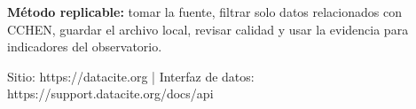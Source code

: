 \documentclass[9pt,a4paper]{extarticle}
\begin{document}
\vspace{0.06cm}
\begin{tcolorbox}[enhanced,colback=white,colframe=cchenpurple!55,boxrule=0.45pt,arc=2pt,left=6pt,right=6pt,top=5pt,bottom=5pt]
{\bfseries\color{cchenpurple}Método replicable:} tomar la fuente, filtrar solo datos relacionados con CCHEN, guardar el archivo local, revisar calidad y usar la evidencia para indicadores del observatorio.
\end{tcolorbox}

\vspace{0.02cm}
{\scriptsize\color{mutedgray}Sitio: https://datacite.org \quad | \quad Interfaz de datos: https://support.datacite.org/docs/api}
\end{document}
